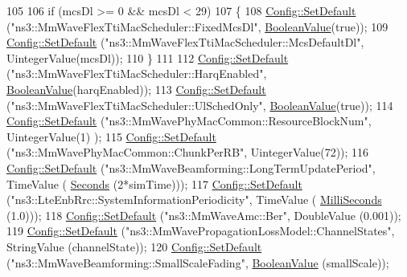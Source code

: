 \begin{DoxyCode}
105 
106         \textcolor{keywordflow}{if} (mcsDl >= 0 && mcsDl < 29)
107         \{
108                 \hyperlink{group__config_ga2e7882df849d8ba4aaad31c934c40c06}{Config::SetDefault} (\textcolor{stringliteral}{"ns3::MmWaveFlexTtiMacScheduler::FixedMcsDl"}, 
      \hyperlink{classns3_1_1BooleanValue}{BooleanValue}(\textcolor{keyword}{true}));
109                 \hyperlink{group__config_ga2e7882df849d8ba4aaad31c934c40c06}{Config::SetDefault} (\textcolor{stringliteral}{"ns3::MmWaveFlexTtiMacScheduler::McsDefaultDl"}, 
      UintegerValue(mcsDl));
110         \}
111 
112         \hyperlink{group__config_ga2e7882df849d8ba4aaad31c934c40c06}{Config::SetDefault} (\textcolor{stringliteral}{"ns3::MmWaveFlexTtiMacScheduler::HarqEnabled"}, 
      \hyperlink{classns3_1_1BooleanValue}{BooleanValue}(harqEnabled));
113         \hyperlink{group__config_ga2e7882df849d8ba4aaad31c934c40c06}{Config::SetDefault} (\textcolor{stringliteral}{"ns3::MmWaveFlexTtiMacScheduler::UlSchedOnly"}, 
      \hyperlink{classns3_1_1BooleanValue}{BooleanValue}(\textcolor{keyword}{true}));
114         \hyperlink{group__config_ga2e7882df849d8ba4aaad31c934c40c06}{Config::SetDefault} (\textcolor{stringliteral}{"ns3::MmWavePhyMacCommon::ResourceBlockNum"}, UintegerValue(1)
      );
115         \hyperlink{group__config_ga2e7882df849d8ba4aaad31c934c40c06}{Config::SetDefault} (\textcolor{stringliteral}{"ns3::MmWavePhyMacCommon::ChunkPerRB"}, UintegerValue(72));
116         \hyperlink{group__config_ga2e7882df849d8ba4aaad31c934c40c06}{Config::SetDefault} (\textcolor{stringliteral}{"ns3::MmWaveBeamforming::LongTermUpdatePeriod"}, TimeValue (
      \hyperlink{group__timecivil_ga33c34b816f8ff6628e33d5c8e9713b9e}{Seconds} (2*simTime)));
117         \hyperlink{group__config_ga2e7882df849d8ba4aaad31c934c40c06}{Config::SetDefault} (\textcolor{stringliteral}{"ns3::LteEnbRrc::SystemInformationPeriodicity"}, TimeValue (
      \hyperlink{group__timecivil_gaf26127cf4571146b83a92ee18679c7a9}{MilliSeconds} (1.0)));
118         \hyperlink{group__config_ga2e7882df849d8ba4aaad31c934c40c06}{Config::SetDefault} (\textcolor{stringliteral}{"ns3::MmWaveAmc::Ber"}, DoubleValue (0.001));
119         \hyperlink{group__config_ga2e7882df849d8ba4aaad31c934c40c06}{Config::SetDefault} (\textcolor{stringliteral}{"ns3::MmWavePropagationLossModel::ChannelStates"}, StringValue
       (channelState));
120         \hyperlink{group__config_ga2e7882df849d8ba4aaad31c934c40c06}{Config::SetDefault} (\textcolor{stringliteral}{"ns3::MmWaveBeamforming::SmallScaleFading"}, 
      \hyperlink{classns3_1_1BooleanValue}{BooleanValue} (smallScale));

\end{DoxyCode}
